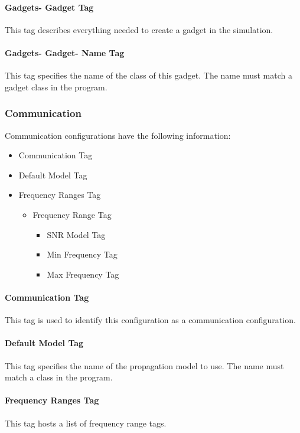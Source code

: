\documentclass[../main.tex]{subfiles}
\begin{document}
\paragraph{Gadgets- Gadget Tag}
This tag describes everything needed to create a gadget in the simulation.

\paragraph{Gadgets- Gadget- Name Tag}
This tag specifies the name of the class of this gadget.
The name must match a gadget class in the program.

\subsubsection{Communication}
Communication configurations have the following information:
\begin{itemize}
    \item Communication Tag
    \item Default Model Tag
    \item Frequency Ranges Tag
    \begin{itemize}
        \item Frequency Range Tag
        \begin{itemize}
            \item SNR Model Tag
            \item Min Frequency Tag
            \item Max Frequency Tag
        \end{itemize}
    \end{itemize}
\end{itemize}

\paragraph{Communication Tag}
This tag is used to identify this configuration as a communication configuration.

\paragraph{Default Model Tag}
This tag specifies the name of the propagation model to use.
The name must match a class in the program.

\paragraph{Frequency Ranges Tag}
This tag hosts a list of frequency range tags.
\end{document}
